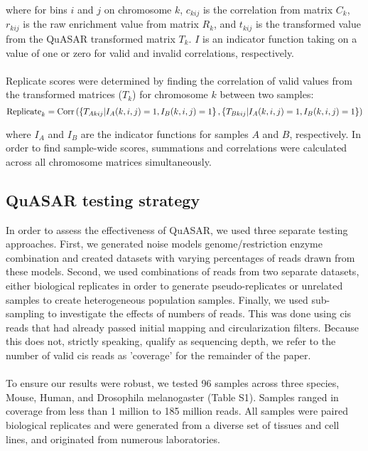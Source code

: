 where for bins $i$ and $j$ on chromosome $k$, $c_{kij}$ is the correlation from matrix $C_k$, $r_{kij}$ is the raw enrichment value from matrix $R_k$, and $t_{kij}$ is the transformed value from the QuASAR transformed matrix $T_k$. $I$ is an indicator function taking on a value of one or zero for valid and invalid correlations, respectively.
\\\\
Replicate scores were determined by finding the correlation of valid values from the transformed matrices ($T_k$) for chromosome $k$ between two samples:
\[\textnormal{Replicate}_{k}=\textnormal{Corr}\left(\left\{T_{Akij}|I_A(k,i,j)=1,I_B(k,i,j)=1\right\},\left\{T_{Bkij}|I_A(k,i,j)=1,I_B(k,i,j)=1\right\}\right)\]

where $I_A$ and $I_B$ are the indicator functions for samples $A$ and $B$, respectively. In order to find sample-wide scores, summations and correlations were calculated across all chromosome matrices simultaneously.


\subsection{QuASAR testing strategy}

In order to assess the effectiveness of QuASAR, we used three separate testing approaches. First, we generated noise models genome/restriction enzyme combination and created datasets with varying percentages of reads drawn from these models. Second, we used combinations of reads from two separate datasets, either biological replicates in order to generate pseudo-replicates or unrelated samples to create heterogeneous population samples. Finally, we used sub-sampling to investigate the effects of numbers of reads. This was done using cis reads that had already passed initial mapping and circularization filters. Because this does not, strictly speaking, qualify as sequencing depth, we refer to the number of valid cis reads as 'coverage' for the remainder of the paper.
\\\\
To ensure our results were robust, we tested 96 samples across three species, Mouse, Human, and Drosophila melanogaster (Table S1). Samples ranged in coverage from less than 1 million to 185 million reads. All samples were paired biological replicates and were generated from a diverse set of tissues and cell lines, and originated from numerous laboratories. 

